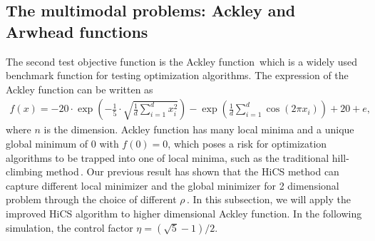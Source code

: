 
\subsection{The multimodal problems: Ackley and Arwhead functions}
\label{subsec:minmulit}

The second test objective function is the Ackley
function\,\cite{dieterich2012empirical} which is a widely used 
benchmark function for testing optimization algorithms.
The expression of the Ackley function can be written as
\begin{align}
	f(x) =
	-20\cdot\exp\left(-\frac{1}{5}\cdot\sqrt{\frac{1}{d}\sum_{i=1}^d
	x_i^2}\right)-
	\exp\left(\frac{1}{d}\sum_{i=1}^d \cos(2\pi x_i)\right)+20+e,
	\label{eqn:ackley}
\end{align}
where $n$ is the dimension.
Ackley function has many local minima and a unique global
minimum of $0$ with $f(0)=0$, which poses a risk for
optimization algorithms to be trapped into one of local
minima, such as the traditional hill-climbing method\,\cite{back1996evolutionary}.
Our previous result has shown that the HiCS method can capture
different local minimizer and the global minimizer for 2
dimensional problem through the choice of different $\rho$\,\cite{huang2017hill}.
In this subsection, we will apply the improved HiCS
algorithm to higher dimensional Ackley function. 
In the following simulation, the control factor
$\eta=(\sqrt{5}-1)/2$.

